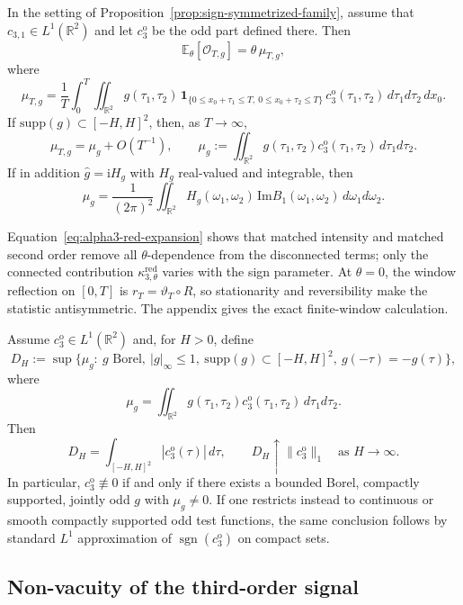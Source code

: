 \documentclass[aap,press]{apt} \volno{00} \partno{00}
\newcommand{\E}{\mathbb{E}}
\newcommand{\R}{\mathbb{R}}
\renewcommand{\ii}{\mathrm{i}}
\newcommand{\1}{\mathbf{1}}
\newcommand{\Imm}{\mathrm{Im}}
\numberwithin{equation}{section}
\begin{document}
\begin{prop}\label{prop:odd-kernel}
In the setting of Proposition~\ref{prop:sign-symmetrized-family}, assume that $c_{3,1}\in L^1(\R^2)$ and let $c_3^{\mathrm o}$ be the odd part defined there. Then
\[
\E_\theta[\mathcal O_{T,g}]=\theta\,\mu_{T,g},
\]
where
\[
\mu_{T,g}
=
\frac{1}{T}\int_0^T\iint_{\R^2}
g(\tau_1,\tau_2)\,
\1_{\{0\le x_0+\tau_1\le T,\ 0\le x_0+\tau_2\le T\}}
\,c_3^{\mathrm o}(\tau_1,\tau_2)\,d\tau_1d\tau_2\,dx_0.
\]
If $\mathrm{supp}(g)\subset[-H,H]^2$, then, as $T\to\infty$,
\[
\mu_{T,g}=\mu_g+O(T^{-1}),
\qquad
\mu_g:=\iint_{\R^2} g(\tau_1,\tau_2)c_3^{\mathrm o}(\tau_1,\tau_2)\,d\tau_1d\tau_2.
\]
If in addition $\widehat g=\ii H_g$ with $H_g$ real-valued and integrable, then
\[
\mu_g
=
\frac{1}{(2\pi)^2}
\iint_{\R^2}H_g(\omega_1,\omega_2)\,\Imm B_1(\omega_1,\omega_2)\,d\omega_1d\omega_2.
\]
\end{prop}

Equation~\eqref{eq:alpha3-red-expansion} shows that matched intensity and matched second order remove all $\theta$-dependence from the disconnected terms; only the connected contribution $\kappa_{3,\theta}^{\mathrm{red}}$ varies with the sign parameter. At $\theta=0$, the window reflection on $[0,T]$ is $r_T=\vartheta_T\circ R$, so stationarity and reversibility make the statistic antisymmetric. The appendix gives the exact finite-window calculation.

\begin{prop}\label{prop:optimal-local-contrast}
Assume $c_3^{\mathrm o}\in L^1(\R^2)$ and, for $H>0$, define
\[
D_H
:=
\sup\Big\{
\mu_g:\ g\text{ Borel},\ |g|_\infty\le1,\ \mathrm{supp}(g)\subset[-H,H]^2,\ g(-\tau)=-g(\tau)
\Big\},
\]
where
\[
\mu_g=\iint_{\R^2} g(\tau_1,\tau_2)c_3^{\mathrm o}(\tau_1,\tau_2)\,d\tau_1d\tau_2.
\]
Then
\[
D_H=\int_{[-H,H]^2}|c_3^{\mathrm o}(\tau)|\,d\tau,
\qquad
D_H\uparrow \|c_3^{\mathrm o}\|_1
\quad\text{as }H\to\infty.
\]
In particular, $c_3^{\mathrm o}\not\equiv0$ if and only if there exists a
bounded Borel, compactly supported, jointly odd $g$ with $\mu_g\neq0$. If one restricts instead to continuous or smooth compactly supported odd test functions, the same conclusion follows by standard $L^1$ approximation of $\operatorname{sgn}(c_3^{\mathrm o})$ on compact sets.
\end{prop}

\subsection{Non-vacuity of the third-order signal}
\end{document}
